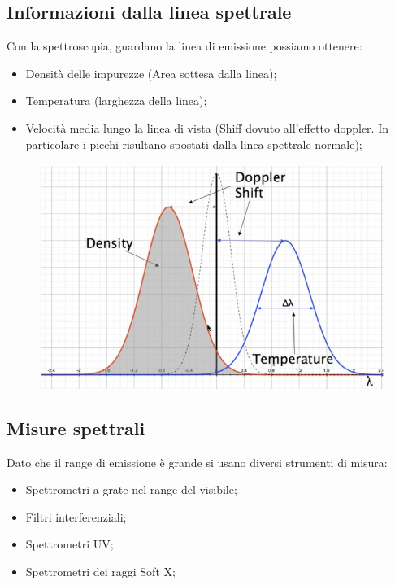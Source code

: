 \documentclass{article}
\begin{document}
\subsection{Informazioni dalla linea spettrale}
Con la spettroscopia, guardano la linea di emissione possiamo ottenere:\begin{itemize}
    \item Densità delle impurezze (Area sottesa dalla linea);
    \item Temperatura (larghezza della linea);
    \item Velocità media lungo la linea di vista (Shiff dovuto all'effetto doppler. In particolare i picchi risultano spostati dalla linea spettrale normale);
\end{itemize}
\begin{center}
    \begin{figure}[b]
        \centering
        \includegraphics[scale=0.4]{2022-06-22-10-52-32.png}%
    \end{figure}
\end{center}
\subsection{Misure spettrali}
Dato che il range di emissione è grande si usano  diversi strumenti di misura:\begin{itemize}
    \item Spettrometri a grate nel range del visibile;
    \item Filtri interferenziali;
    \item Spettrometri UV\@;
    \item Spettrometri dei raggi Soft X\@;
\end{itemize}
\end{document}
